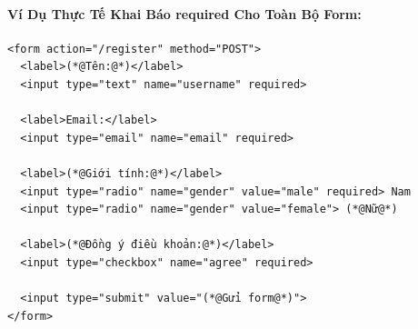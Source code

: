 \paragraph{Ví Dụ Thực Tế Khai Báo required Cho Toàn Bộ Form:}

\begin{codeWindow}
\begin{lstlisting}[language=HTML5]
<form action="/register" method="POST">
  <label>(*@Tên:@*)</label>
  <input type="text" name="username" required>

  <label>Email:</label>
  <input type="email" name="email" required>

  <label>(*@Giới tính:@*)</label>
  <input type="radio" name="gender" value="male" required> Nam
  <input type="radio" name="gender" value="female"> (*@Nữ@*)

  <label>(*@Đồng ý điều khoản:@*)</label>
  <input type="checkbox" name="agree" required>

  <input type="submit" value="(*@Gửi form@*)">
</form>
\end{lstlisting}
\end{codeWindow}

